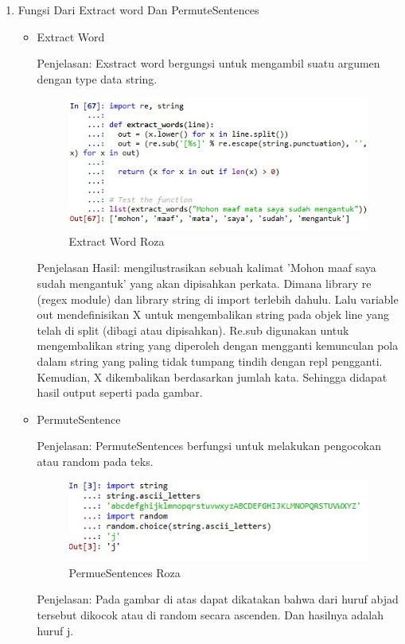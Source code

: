 \begin{enumerate}
\begin{itemize}
\end{itemize}
\item Fungsi Dari Extract word Dan PermuteSentences
\par
\begin{itemize}
\item Extract Word
\par Penjelasan: Exstract word bergungsi untuk mengambil suatu argumen dengan type data string.
\begin{figure}[!hbtp]
\centering
\includegraphics[scale=0.6]{figures/wordroza.jpeg}
\caption{Extract Word Roza}
\label{text-fadila}
\end{figure}
\par Penjelasan Hasil:  mengilustrasikan sebuah kalimat 'Mohon maaf saya sudah mengantuk' yang  akan dipisahkan perkata. Dimana library re (regex module) dan library string di import terlebih dahulu. Lalu variable out mendefinisikan X untuk mengembalikan string pada objek line yang telah di split (dibagi atau dipisahkan). Re.sub digunakan untuk mengembalikan string yang diperoleh dengan mengganti kemunculan pola dalam string yang paling tidak tumpang tindih dengan repl pengganti. Kemudian, X dikembalikan berdasarkan jumlah kata. Sehingga didapat hasil output seperti pada gambar.


\item PermuteSentence
\par Penjelasan: PermuteSentences berfungsi untuk melakukan pengocokan atau random pada teks.
\begin{figure}[!hbtp]
\centering
\includegraphics[scale=0.6]{figures/permutesenroza.jpg}
\caption{PermueSentences Roza}
\label{text-fadila}
\end{figure}
\par Penjelasan: Pada gambar di atas dapat dikatakan bahwa dari huruf abjad tersebut dikocok atau di random secara ascenden. Dan hasilnya adalah huruf j.
\end{itemize}



\end{enumerate}
